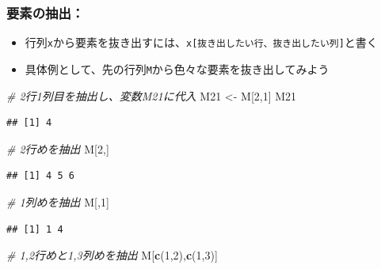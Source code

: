 \documentclass[
]{book}
\newenvironment{Shaded}{\begin{snugshade}}{\end{snugshade}}
\newcommand{\CommentTok}[1]{\textcolor[rgb]{0.56,0.35,0.01}{\textit{#1}}}
\newcommand{\DecValTok}[1]{\textcolor[rgb]{0.00,0.00,0.81}{#1}}
\newcommand{\FunctionTok}[1]{\textcolor[rgb]{0.13,0.29,0.53}{\textbf{#1}}}
\newcommand{\NormalTok}[1]{#1}
\newcommand{\OtherTok}[1]{\textcolor[rgb]{0.56,0.35,0.01}{#1}}
\providecommand{\tightlist}{%
  \setlength{\itemsep}{0pt}\setlength{\parskip}{0pt}}
\begin{document}
\hypertarget{ux8981ux7d20ux306eux62bdux51fa-1}{%
\subsubsection*{要素の抽出：}\label{ux8981ux7d20ux306eux62bdux51fa-1}}

\begin{itemize}
\tightlist
\item
  行列\texttt{x}から要素を抜き出すには、\texttt{x{[}抜き出したい行、抜き出したい列{]}}と書く
\item
  具体例として、先の行列\texttt{M}から色々な要素を抜き出してみよう
\end{itemize}

\begin{Shaded}
\begin{Highlighting}[]
\CommentTok{\# 2行1列目を抽出し、変数M21に代入}
\NormalTok{M21 }\OtherTok{\textless{}{-}}\NormalTok{ M[}\DecValTok{2}\NormalTok{,}\DecValTok{1}\NormalTok{]}
\NormalTok{M21}
\end{Highlighting}
\end{Shaded}

\begin{verbatim}
## [1] 4
\end{verbatim}

\begin{Shaded}
\begin{Highlighting}[]
\CommentTok{\# 2行めを抽出}
\NormalTok{M[}\DecValTok{2}\NormalTok{,]}
\end{Highlighting}
\end{Shaded}

\begin{verbatim}
## [1] 4 5 6
\end{verbatim}

\begin{Shaded}
\begin{Highlighting}[]
\CommentTok{\# 1列めを抽出}
\NormalTok{M[,}\DecValTok{1}\NormalTok{]}
\end{Highlighting}
\end{Shaded}

\begin{verbatim}
## [1] 1 4
\end{verbatim}

\begin{Shaded}
\begin{Highlighting}[]
\CommentTok{\# 1,2行めと1,3列めを抽出}
\NormalTok{M[}\FunctionTok{c}\NormalTok{(}\DecValTok{1}\NormalTok{,}\DecValTok{2}\NormalTok{),}\FunctionTok{c}\NormalTok{(}\DecValTok{1}\NormalTok{,}\DecValTok{3}\NormalTok{)]}
\end{Highlighting}
\end{Shaded}
\end{document}
